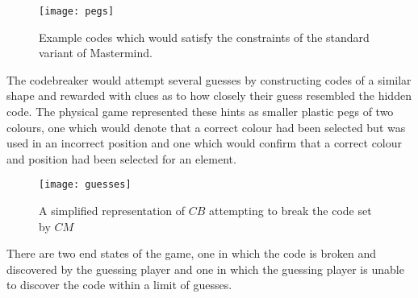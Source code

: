 \begin{figure}[H]
\centering
\texttt{[image: pegs]}
\caption{ Example codes which would satisfy the constraints of the standard variant of Mastermind.}
\end{figure}

The codebreaker would attempt several guesses by constructing codes of a similar shape and rewarded with clues as to how closely their guess resembled the hidden code.
The physical game represented these hints as smaller plastic pegs of two colours, one which would denote that a correct colour had been selected but was used in an incorrect
position and one which would confirm that a correct colour and position had been selected for an element.
\begin{figure}[H]
\centering
\texttt{[image: guesses]}
\caption{A simplified representation of $CB$ attempting to break the code set by $CM$}
\end{figure}

There are two end states of the game, one in which the code is broken and discovered by the guessing player and one in which the guessing player is unable to discover the code
within a limit of guesses.

